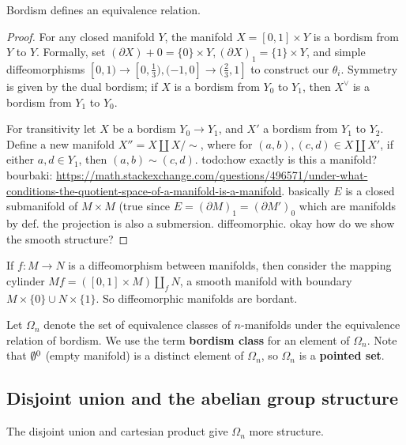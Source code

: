 \begin{lemma}
    Bordism defines an equivalence relation.
\end{lemma}
\begin{proof}
    For any closed manifold $Y$, the manifold $X=[0,1] \times Y$ is a bordism from $Y$ to $Y$. Formally, set $(\partial X)+0= \{0\} \times Y, (\partial X)_1= \{1\} \times Y$, and simple diffeomorphisms $[0,1) \to [0, \frac{1}{3}), (-1,0] \to (\frac{2}{3},1]$ to construct our $\theta_i $. Symmetry is given by the dual bordism; if $X$ is a bordism from $Y_0$ to $Y_1$, then $X^{\vee}$ is a bordism from $Y_1$ to $Y_0$. 

    For transitivity let $X$ be a bordism $Y_0 \to Y_1$, and $X'$ a bordism from $Y_1$ to $Y_2$. Define a new manifold $X''= X \amalg X /\sim$, where for $(a,b),(c,d) \in X \amalg X'$, if either $a,d \in Y_1$, then $(a,b)\sim(c,d)$. {\color{red}todo:how exactly is this a manifold? bourbaki: \url{https://math.stackexchange.com/questions/496571/under-what-conditions-the-quotient-space-of-a-manifold-is-a-manifold}. basically $E$ is a closed submanifold of $M \times M$ (true since $E=(\partial M)_1=(\partial M')_0$ which are manifolds by def. the projection is also a submersion. diffeomorphic. okay how do we show the smooth structure?} 

\end{proof}
\begin{example}
    If $f \colon M \to N$ is a diffeomorphism between manifolds, then consider the mapping cylinder $Mf=([0,1]\times M)\amalg_f N$, a smooth manifold with boundary $M \times \{0\} \cup N\times \{1\} $. So diffeomorphic manifolds are bordant.
\end{example}
Let $\Omega_n $ denote the set of equivalence classes of $n$-manifolds under the equivalence relation of bordism. We use the term \textbf{bordism class} for an element of $\Omega_n $. Note that $\emptyset^0$ (empty manifold) is a distinct element of $\Omega_n $, so $\Omega_n $ is a \textbf{pointed set}.

\subsection{Disjoint union and the abelian group structure}
The disjoint union and cartesian product give $\Omega_n $ more structure.

